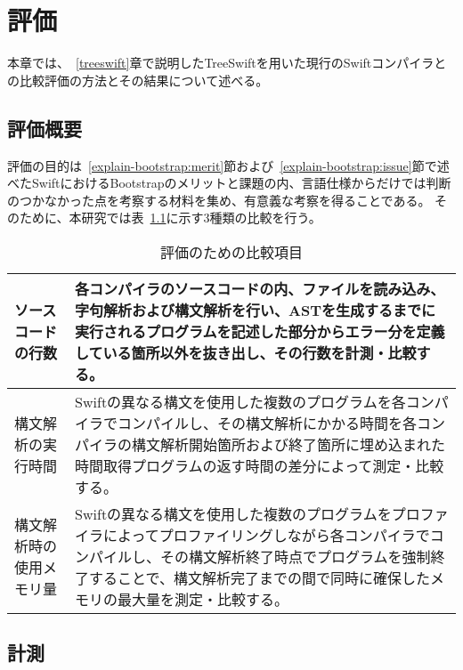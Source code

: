 \chapter{評価}
\label{evaluation}

本章では、~\ref{treeswift}章で説明したTreeSwiftを用いた現行のSwiftコンパイラとの比較評価の方法とその結果について述べる。


\section{評価概要}

評価の目的は~\ref{explain-bootstrap:merit}節および~\ref{explain-bootstrap:issue}節で述べたSwiftにおけるBootstrapのメリットと課題の内、言語仕様からだけでは判断のつかなかった点を考察する材料を集め、有意義な考察を得ることである。
そのために、本研究では表~\ref{table:evaluation-items}に示す3種類の比較を行う。

\begin{table}[hb]
    \begin{center}
        \caption{評価のための比較項目}
        \begin{tabular}{|m{5cm}|m{10cm}|}
            \hline
            ソースコードの行数 & 各コンパイラのソースコードの内、ファイルを読み込み、字句解析および構文解析を行い、ASTを生成するまでに実行されるプログラムを記述した部分からエラー分を定義している箇所以外を抜き出し、その行数を計測・比較する。 \\
            \hline
            構文解析の実行時間 & Swiftの異なる構文を使用した複数のプログラムを各コンパイラでコンパイルし、その構文解析にかかる時間を各コンパイラの構文解析開始箇所および終了箇所に埋め込まれた時間取得プログラムの返す時間の差分によって測定・比較する。 \\
            \hline
            構文解析時の使用メモリ量 & Swiftの異なる構文を使用した複数のプログラムをプロファイラによってプロファイリングしながら各コンパイラでコンパイルし、その構文解析終了時点でプログラムを強制終了することで、構文解析完了までの間で同時に確保したメモリの最大量を測定・比較する。 \\
            \hline
        \end{tabular}
        \label{table:evaluation-items}
    \end{center}
\end{table}


\section{計測}

